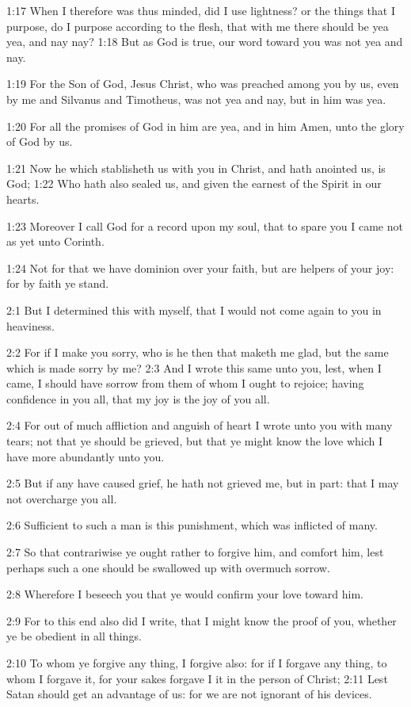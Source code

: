 1:17 When I therefore was thus minded, did I use lightness? or the
things that I purpose, do I purpose according to the flesh, that with
me there should be yea yea, and nay nay?  1:18 But as God is true, our
word toward you was not yea and nay.

1:19 For the Son of God, Jesus Christ, who was preached among you by
us, even by me and Silvanus and Timotheus, was not yea and nay, but in
him was yea.

1:20 For all the promises of God in him are yea, and in him Amen, unto
the glory of God by us.

1:21 Now he which stablisheth us with you in Christ, and hath anointed
us, is God; 1:22 Who hath also sealed us, and given the earnest of the
Spirit in our hearts.

1:23 Moreover I call God for a record upon my soul, that to spare you
I came not as yet unto Corinth.

1:24 Not for that we have dominion over your faith, but are helpers of
your joy: for by faith ye stand.

2:1 But I determined this with myself, that I would not come again to
you in heaviness.

2:2 For if I make you sorry, who is he then that maketh me glad, but
the same which is made sorry by me?  2:3 And I wrote this same unto
you, lest, when I came, I should have sorrow from them of whom I ought
to rejoice; having confidence in you all, that my joy is the joy of
you all.

2:4 For out of much affliction and anguish of heart I wrote unto you
with many tears; not that ye should be grieved, but that ye might know
the love which I have more abundantly unto you.

2:5 But if any have caused grief, he hath not grieved me, but in part:
that I may not overcharge you all.

2:6 Sufficient to such a man is this punishment, which was inflicted
of many.

2:7 So that contrariwise ye ought rather to forgive him, and comfort
him, lest perhaps such a one should be swallowed up with overmuch
sorrow.

2:8 Wherefore I beseech you that ye would confirm your love toward
him.

2:9 For to this end also did I write, that I might know the proof of
you, whether ye be obedient in all things.

2:10 To whom ye forgive any thing, I forgive also: for if I forgave
any thing, to whom I forgave it, for your sakes forgave I it in the
person of Christ; 2:11 Lest Satan should get an advantage of us: for
we are not ignorant of his devices.

